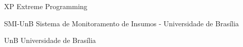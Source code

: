 \begin{siglas}
  \item[XP] Extreme Programming
  \item[SMI-UnB] Sistema de Monitoramento de Insumos - Universidade de Brasília
  \item[UnB] Universidade de Brasília
\end{siglas}
